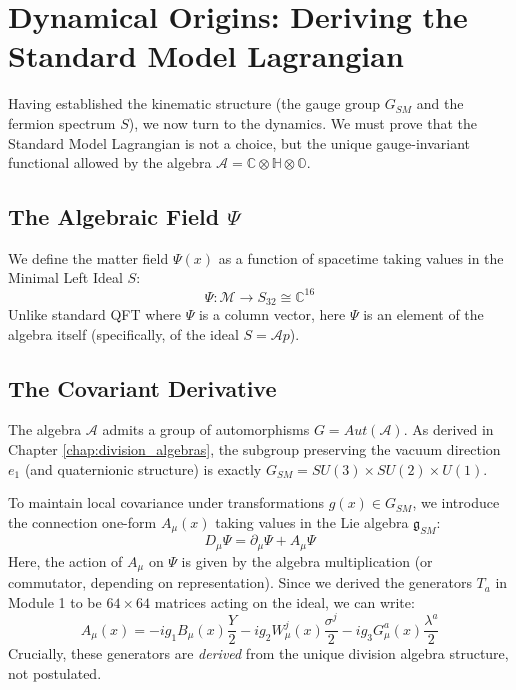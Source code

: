 \section{Dynamical Origins: Deriving the Standard Model Lagrangian}
\label{sec:dynamics}

Having established the kinematic structure (the gauge group $G_{SM}$ and the fermion spectrum $S$), we now turn to the dynamics. We must prove that the Standard Model Lagrangian is not a choice, but the unique gauge-invariant functional allowed by the algebra $\mathcal{A} = \mathbb{C} \otimes \mathbb{H} \otimes \mathbb{O}$.

\subsection{The Algebraic Field $\Psi$}
We define the matter field $\Psi(x)$ as a function of spacetime taking values in the Minimal Left Ideal $S$:
\begin{equation}
    \Psi: \mathcal{M} \to S_{32} \cong \mathbb{C}^{16}
\end{equation}
Unlike standard QFT where $\Psi$ is a column vector, here $\Psi$ is an element of the algebra itself (specifically, of the ideal $S = \mathcal{A}p$).

\subsection{The Covariant Derivative}
The algebra $\mathcal{A}$ admits a group of automorphisms $G = Aut(\mathcal{A})$. As derived in Chapter \ref{chap:division_algebras}, the subgroup preserving the vacuum direction $e_1$ (and quaternionic structure) is exactly $G_{SM} = SU(3) \times SU(2) \times U(1)$.

To maintain local covariance under transformations $g(x) \in G_{SM}$, we introduce the connection one-form $A_\mu(x)$ taking values in the Lie algebra $\mathfrak{g}_{SM}$:
\begin{equation}
    D_\mu \Psi = \partial_\mu \Psi + A_\mu \Psi
\end{equation}
Here, the action of $A_\mu$ on $\Psi$ is given by the algebra multiplication (or commutator, depending on representation). Since we derived the generators $T_a$ in Module 1 to be $64 \times 64$ matrices acting on the ideal, we can write:
\begin{equation}
    A_\mu(x) = -i g_1 B_\mu(x) \frac{Y}{2} - i g_2 W_\mu^j(x) \frac{\sigma^j}{2} - i g_3 G_\mu^a(x) \frac{\lambda^a}{2}
\end{equation}
Crucially, these generators are \textit{derived} from the unique division algebra structure, not postulated.

